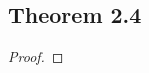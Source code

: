 \documentclass[../../main.tex]{subfiles}
\begin{document}
\subsection{Theorem 2.4}
\begin{wts}

\end{wts}
\begin{proof}

\end{proof}
\end{document}
